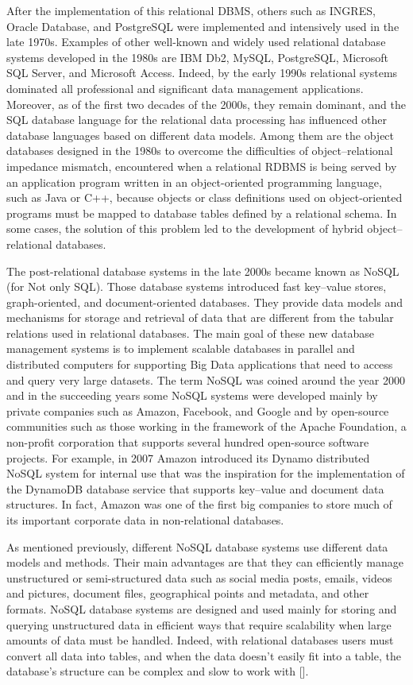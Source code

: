 After the implementation of this relational DBMS, others such as INGRES, \hbox{Oracle} Database, and PostgreSQL were implemented and intensively used in the late 1970s. Examples of other well-known and widely used relational database systems developed in the 1980s are IBM Db2, MySQL, PostgreSQL, Microsoft SQL Server, and Microsoft Access. Indeed, by the early 1990s relational systems dominated all professional and significant data management applications. Moreover, as of the first two decades of the 2000s, they remain dominant, and the SQL database language for the relational data processing has influenced other database languages based on different data models. Among them are the object databases designed in the 1980s to overcome the difficulties of object--relational impedance mismatch, encountered when a relational RDBMS is being served by an application program written in an object-oriented programming language, such as Java or C++, because objects or class definitions used on object-oriented programs must be mapped to database tables defined by a relational schema. In some cases, the solution of this problem led to the development of hybrid object--relational databases.

The post-relational database systems in the late 2000s became known as NoSQL (for Not only SQL). Those database systems introduced fast key--value stores, graph-oriented, and document-oriented databases. They provide data models and mechanisms for storage and retrieval of data that are different from the tabular relations used in relational databases. The main goal of these new database management systems is to implement scalable databases in parallel and distributed computers for supporting Big Data applications that need to access and query very large datasets. The term NoSQL was coined around the year 2000 and in the succeeding years some NoSQL systems were developed mainly by private companies such as Amazon, Facebook, and Google and by open-source communities such as those working in the framework of the Apache Foundation, a non-profit corporation that supports several hundred open-source software projects. For example, in 2007 Amazon introduced its Dynamo distributed NoSQL system for internal use that was the inspiration for the implementation of the DynamoDB database service that supports key--value and document data structures. In fact, Amazon was one of the first big companies to store much of its important corporate data in non-relational databases.

As mentioned previously, different NoSQL database systems use different data models and methods. Their main advantages are that they can efficiently manage unstructured or semi-structured data such as social media posts, emails, videos and pictures, document files, geographical points and metadata, and other formats. NoSQL database systems are designed and used mainly for storing and querying unstructured data in efficient ways that require scalability when large amounts of data must be handled. Indeed, with relational databases users must convert all data into tables, and when the data doesn't easily fit into a table, the database's structure can be complex and slow to work with [\citealt{chap:3:Leavitt:2010}].


